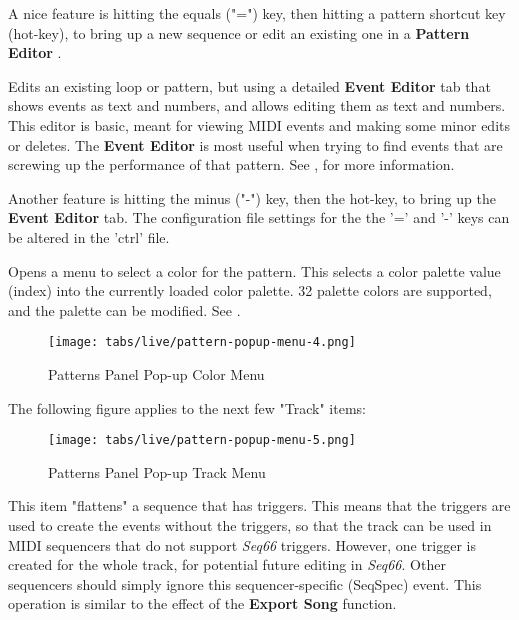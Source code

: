 
   A nice feature is hitting the equals ("=") key, then hitting
   a pattern shortcut key (hot-key), to bring up a new sequence or edit an
   existing one in a \textbf{Pattern Editor} .

   Edits an existing loop or pattern, but using a detailed \textbf{Event Editor}
   tab that shows events as text and numbers, and allows editing them as text
   and numbers.
   This editor is basic, meant for viewing
   MIDI events and making some minor edits or deletes.
   The \textbf{Event Editor} is most useful when trying to find events
   that are screwing up the performance of that pattern.
   See , for more information.

   Another feature is hitting the minus
   ("-") key, then the hot-key, to bring up the \textbf{Event Editor} tab.
   The configuration file settings for the the '=' and
   '-' keys can be altered in the 'ctrl' file.

   Opens a menu to select a color for the pattern.  This selects a color
   palette value (index) into the currently loaded color palette.
   32 palette colors are supported, and the palette can be modified.
   See .

\begin{figure}[H]
   \centering 
   \texttt{[image: tabs/live/pattern-popup-menu-4.png]}
   \caption{Patterns Panel Pop-up Color Menu}
   \label{fig:patterns_panel_popup_color_menu}
\end{figure}

   The following figure applies to the next few "Track" items:

\begin{figure}[H]
   \centering 
   \texttt{[image: tabs/live/pattern-popup-menu-5.png]}
   \caption{Patterns Panel Pop-up Track Menu}
   \label{fig:patterns_panel_popup_track_menu}
\end{figure}

   This item "flattens" a sequence that has triggers.
   This means that the triggers are used to create the events without
   the triggers, so that the track can be used in MIDI sequencers that
   do not support \textsl{Seq66} triggers.
   However, one trigger is created for the whole track, for potential
   future editing in \textsl{Seq66}.
   Other sequencers should simply ignore this sequencer-specific (SeqSpec)
   event.
   This operation is similar to the effect of the \textbf{Export Song}
   function.

